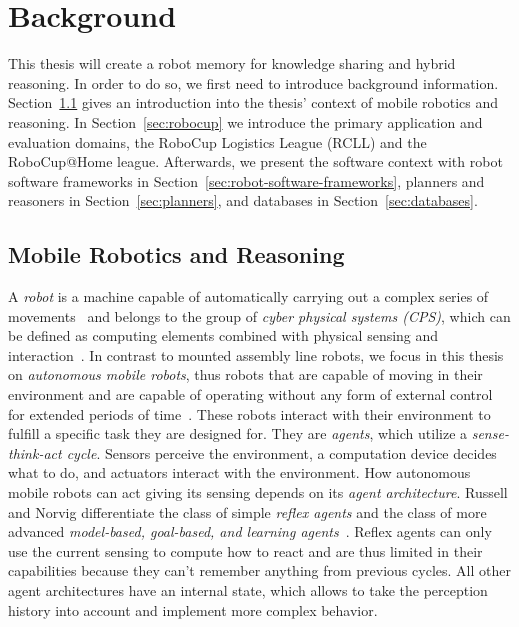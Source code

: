 \chapter{Background}
\label{chap:background}
This thesis will create a robot memory for knowledge sharing and
hybrid reasoning. In order to do so, we first need to introduce
background information. Section~\ref{sec:mobile-robotics} gives an
introduction into the thesis' context of mobile robotics and
reasoning. In Section~\ref{sec:robocup} we introduce the primary
application and evaluation domains, the RoboCup Logistics League
(RCLL) and the RoboCup@Home league. Afterwards, we present the
software context with robot software frameworks in
Section~\ref{sec:robot-software-frameworks}, planners and reasoners in
Section~\ref{sec:planners}, and databases in
Section~\ref{sec:databases}.  

\section{Mobile Robotics and Reasoning}
\label{sec:mobile-robotics}
A \emph{robot} is a machine capable of automatically carrying out a
  complex series of movements~\cite{robot-dict} and belongs to the
group of \emph{cyber physical systems (CPS)}, which can be defined
as computing elements combined with physical sensing and
  interaction~\cite{chapter-cps}. In contrast to mounted assembly
line robots, we focus in this thesis on \emph{autonomous mobile robots}, thus
robots that are capable of moving in their environment and
are capable of operating without any form of external control
  for extended periods of time~\cite{autonomous-robots}. These robots
interact with their environment to fulfill a specific task they are
designed for. They are \emph{agents}, which utilize a
\emph{sense-think-act cycle}. Sensors perceive the
environment, a computation device decides what to do, and actuators
interact with the environment. How autonomous mobile robots can
act giving its sensing depends on its \emph{agent
  architecture}. Russell and Norvig differentiate the class of simple
\emph{reflex agents} and the class of more advanced
\emph{model-based, goal-based, and learning
  agents}~\cite{aimodern}. Reflex agents can only use the current
sensing to compute how to react and are thus limited in their
capabilities because they can't remember anything from previous
cycles. All other agent architectures have an internal state, which
allows to take the perception history into account and implement more
complex behavior.

